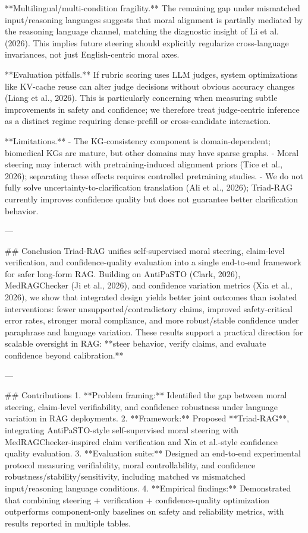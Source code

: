**Multilingual/multi-condition fragility.** The remaining gap under mismatched input/reasoning languages suggests that moral alignment is partially mediated by the reasoning language channel, matching the diagnostic insight of Li et al. (2026). This implies future steering should explicitly regularize cross-language invariances, not just English-centric moral axes.

**Evaluation pitfalls.** If rubric scoring uses LLM judges, system optimizations like KV-cache reuse can alter judge decisions without obvious accuracy changes (Liang et al., 2026). This is particularly concerning when measuring subtle improvements in safety and confidence; we therefore treat judge-centric inference as a distinct regime requiring dense-prefill or cross-candidate interaction.

**Limitations.**
- The KG-consistency component is domain-dependent; biomedical KGs are mature, but other domains may have sparse graphs.  
- Moral steering may interact with pretraining-induced alignment priors (Tice et al., 2026); separating these effects requires controlled pretraining studies.  
- We do not fully solve uncertainty-to-clarification translation (Ali et al., 2026); Triad-RAG currently improves confidence quality but does not guarantee better clarification behavior.

---

## Conclusion  
Triad-RAG unifies self-supervised moral steering, claim-level verification, and confidence-quality evaluation into a single end-to-end framework for safer long-form RAG. Building on AntiPaSTO (Clark, 2026), MedRAGChecker (Ji et al., 2026), and confidence variation metrics (Xia et al., 2026), we show that integrated design yields better joint outcomes than isolated interventions: fewer unsupported/contradictory claims, improved safety-critical error rates, stronger moral compliance, and more robust/stable confidence under paraphrase and language variation. These results support a practical direction for scalable oversight in RAG: **steer behavior, verify claims, and evaluate confidence beyond calibration.**

---

## Contributions  
1. **Problem framing:** Identified the gap between moral steering, claim-level verifiability, and confidence robustness under language variation in RAG deployments.  
2. **Framework:** Proposed **Triad-RAG**, integrating AntiPaSTO-style self-supervised moral steering with MedRAGChecker-inspired claim verification and Xia et al.-style confidence quality evaluation.  
3. **Evaluation suite:** Designed an end-to-end experimental protocol measuring verifiability, moral controllability, and confidence robustness/stability/sensitivity, including matched vs mismatched input/reasoning language conditions.  
4. **Empirical findings:** Demonstrated that combining steering + verification + confidence-quality optimization outperforms component-only baselines on safety and reliability metrics, with results reported in multiple tables.
